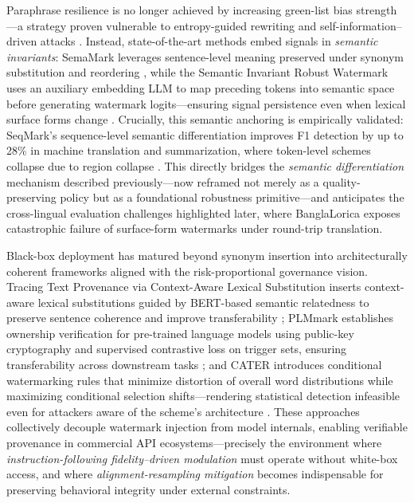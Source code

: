 \documentclass[11pt,a4paper]{article}
\begin{document}
Paraphrase resilience is no longer achieved by increasing green-list bias strength---a strategy proven vulnerable to entropy-guided rewriting \cite{arxiv:2505.05190} and self-information--driven attacks \cite{arxiv:2505.05190}. Instead, state-of-the-art methods embed signals in \emph{semantic invariants}: SemaMark leverages sentence-level meaning preserved under synonym substitution and reordering \cite{doi:10.18653/v1/2024.findings-naacl.40}, while the Semantic Invariant Robust Watermark uses an auxiliary embedding LLM to map preceding tokens into semantic space before generating watermark logits---ensuring signal persistence even when lexical surface forms change \cite{arxiv:2310.06356}. Crucially, this semantic anchoring is empirically validated: SeqMark's sequence-level semantic differentiation improves F1 detection by up to 28\% in machine translation and summarization, where token-level schemes collapse due to region collapse \cite{arxiv:2601.11629}. This directly bridges the \emph{semantic differentiation} mechanism described previously---now reframed not merely as a quality-preserving policy but as a foundational robustness primitive---and anticipates the cross-lingual evaluation challenges highlighted later, where BanglaLorica exposes catastrophic failure of surface-form watermarks under round-trip translation.

Black-box deployment has matured beyond synonym insertion into architecturally coherent frameworks aligned with the risk-proportional governance vision. Tracing Text Provenance via Context-Aware Lexical Substitution inserts context-aware lexical substitutions guided by BERT-based semantic relatedness to preserve sentence coherence and improve transferability \cite{doi:10.1609/aaai.v36i10.21415}; PLMmark establishes ownership verification for pre-trained language models using public-key cryptography and supervised contrastive loss on trigger sets, ensuring transferability across downstream tasks \cite{arxiv:2402.16187}; and CATER introduces conditional watermarking rules that minimize distortion of overall word distributions while maximizing conditional selection shifts---rendering statistical detection infeasible even for attackers aware of the scheme's architecture \cite{doi:10.34190/icair.4.1.3128}. These approaches collectively decouple watermark injection from model internals, enabling verifiable provenance in commercial API ecosystems---precisely the environment where \emph{instruction-following fidelity--driven modulation} must operate without white-box access, and where \emph{alignment-resampling mitigation} becomes indispensable for preserving behavioral integrity under external constraints.
\end{document}
